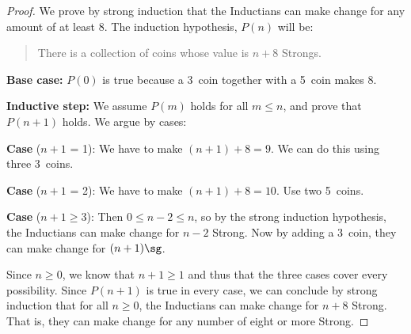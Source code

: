 \begin{proof}

  We prove by strong induction that the Inductians can make change for any
  amount of at least 8\sg.  The induction hypothesis, $P(n)$ will be:
\begin{quote}
There is a collection of coins whose value is $n+8$ Strongs.
\end{quote}

\iffalse
\begin{editingnotes}
Notice that $P(n)$ is an implication.  When the hypothesis of an
implication is false, we know the whole implication is true.  In this
situation, the implication is said to be \emph{vacuously} true.  So $P(n)$
will be vacuously true whenever $n < 8$.
\iffalse
\footnote{Another approach that
avoids these vacuous cases is to define
\[
Q(n) \eqdef \text{there is a collection of coins whose value is $n+8\sg$},
\]
and prove that $Q(n)$ holds for all $n \geq 0$.

}\fi

We now proceed with the induction proof:
\end{editingnotes}\fi

\textbf{Base case:} $P(0)$ is true because a 3\sg\ coin together with
a 5\sg\ coin makes 8\sg.

\textbf{Inductive step:}  We assume $P(m)$ holds for all $m \leq n$, and
prove that $P(n+1)$ holds.  We argue by cases:

\textbf{Case} ($n+1$ = 1): We have to make $(n+1) +8 =9$\sg.  We can do this using three 3\sg\ coins.

\textbf{Case} ($n+1$ = 2): We have to make $(n+1) +8 =10$\sg.  Use two
5\sg\ coins.

\textbf{Case} ($n+1 \geq 3$): Then $0 \leq n - 2 \leq n$, so by the
strong induction hypothesis, the Inductians can make change for $n-2$
Strong.  Now by adding a 3\sg\ coin, they can make change for
$(n+1)\sg$.

Since $n \ge 0$, we know that $n + 1 \ge 1$ and thus that the three cases
cover every possibility.  Since $P(n+1)$ is true in every case, we can
conclude by strong induction
that for all $n \ge 0$, the Inductians can make change for $n+8$
Strong.  That is, they can make change for any number of eight or more
Strong.

\end{proof}

